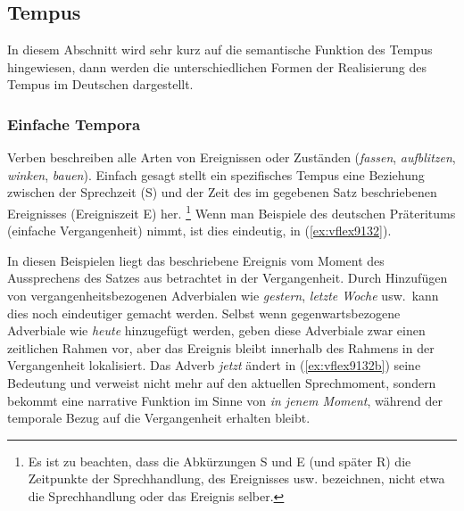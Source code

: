 \subsection{Tempus}

\label{sec:tempus}

In diesem Abschnitt wird sehr kurz auf die semantische Funktion des Tempus hingewiesen, dann werden die unterschiedlichen Formen der Realisierung des Tempus im Deutschen dargestellt.

\subsubsection{Einfache Tempora}

\label{sec:einftemp}


Verben beschreiben alle Arten von Ereignissen oder Zuständen (\textit{fassen}, \textit{aufblitzen}, \textit{winken}, \textit{bauen}).
Einfach gesagt stellt ein spezifisches Tempus eine Beziehung zwischen der Sprechzeit (S) und der Zeit des im gegebenen Satz beschriebenen Ereignisses (Ereigniszeit E) her.%
\footnote{Es ist zu beachten, dass die Abkürzungen S und E (und später R) die Zeitpunkte der Sprechhandlung, des Ereignisses usw. bezeichnen, nicht etwa die Sprechhandlung oder das Ereignis selber.}
Wenn man Beispiele des deutschen Präteritums (einfache Vergangenheit) nimmt, ist dies eindeutig, \zB in (\ref{ex:vflex9132}).

\begin{exe}
  \ex\label{ex:vflex9132}
  \begin{xlist}
  \end{xlist}
\end{exe}

In diesen Beispielen liegt das beschriebene Ereignis vom Moment des Aussprechens des Satzes aus betrachtet in der Vergangenheit.
Durch Hinzufügen von vergangenheitsbezogenen Adverbialen wie \textit{gestern}, \textit{letzte Woche} usw.\ kann dies noch eindeutiger gemacht werden.
Selbst wenn gegenwartsbezogene Adverbiale wie \textit{heute} hinzugefügt werden, geben diese Adverbiale zwar einen zeitlichen Rahmen vor, aber das Ereignis bleibt innerhalb des Rahmens in der Vergangenheit lokalisiert.
Das Adverb \textit{jetzt} ändert in (\ref{ex:vflex9132b}) seine Bedeutung und verweist nicht mehr auf den aktuellen Sprechmoment, sondern bekommt eine narrative Funktion im Sinne von \textit{in jenem Moment}, während der temporale Bezug auf die Vergangenheit erhalten bleibt.

